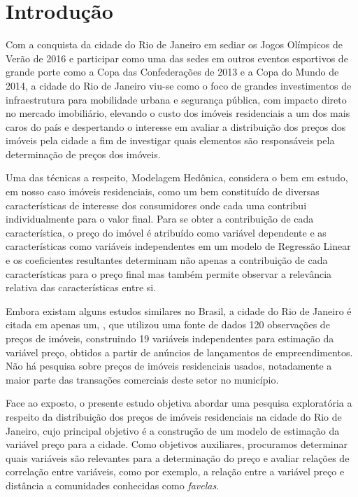 \cleardoublepage

\pagestyle{fancy}


\chapter{Introdução}\label{intro}

 Com a conquista da cidade do Rio de Janeiro em sediar os Jogos Olímpicos de Verão de  2016 e participar como uma das sedes em outros eventos esportivos de grande porte como a Copa das Confederações de  2013 e a Copa do Mundo de 2014, a cidade do Rio de Janeiro viu-se como o foco de grandes investimentos de infraestrutura para mobilidade urbana e segurança pública, com impacto direto no mercado imobiliário, elevando o custo dos imóveis residenciais a um dos mais caros do país e despertando o interesse em avaliar a distribuição dos preços dos imóveis pela cidade a fim de investigar quais elementos são responsáveis pela determinação de preços dos imóveis.
 
 Uma das técnicas a respeito, Modelagem Hedônica, considera o bem em estudo, em nosso caso imóveis residenciais, como um bem constituído de diversas características de interesse dos consumidores onde cada uma contribui individualmente para o valor final. Para se obter a contribuição de cada característica, o preço do imóvel é atribuído como variável dependente e as características como variáveis independentes em um modelo de Regressão Linear e os coeficientes resultantes  determinam não apenas a contribuição de cada características para o preço final mas também permite observar a relevância relativa das características entre si. 

Embora existam alguns estudos similares no Brasil, a cidade do Rio de Janeiro é citada em apenas um,  \cite{Neto}, que utilizou  uma fonte de dados 120 observações de preços de imóveis, construindo 19 variáveis independentes para estimação da variável preço, obtidos a partir de anúncios de lançamentos de empreendimentos. Não há pesquisa sobre preços de imóveis residenciais usados, notadamente a maior parte das transações comerciais deste setor no município. 

Face ao exposto, o presente estudo objetiva abordar uma pesquisa exploratória a respeito da distribuição dos preços de imóveis residenciais na cidade do Rio de Janeiro, cujo principal objetivo é a construção de um modelo de estimação da variável preço para a cidade. Como objetivos auxiliares, procuramos determinar quais variáveis são relevantes para a determinação do preço e avaliar relações de correlação entre variáveis, como por exemplo, a relação entre a variável preço e distância a comunidades conhecidas como \textit{favelas}.

